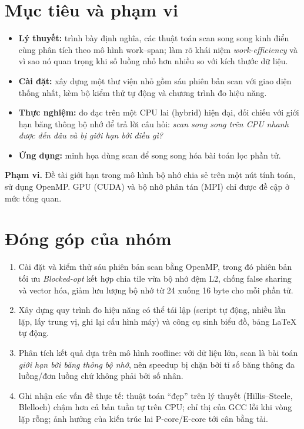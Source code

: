 \section{Mục tiêu và phạm vi}

\begin{itemize}
  \item \textbf{Lý thuyết:} trình bày định nghĩa, các thuật toán scan song song kinh điển cùng
        phân tích theo mô hình work--span; làm rõ khái niệm \emph{work-efficiency} và vì sao nó
        quan trọng khi số luồng nhỏ hơn nhiều so với kích thước dữ liệu.
  \item \textbf{Cài đặt:} xây dựng một thư viện nhỏ gồm sáu phiên bản scan với giao diện thống
        nhất, kèm bộ kiểm thử tự động và chương trình đo hiệu năng.
  \item \textbf{Thực nghiệm:} đo đạc trên một CPU lai (hybrid) hiện đại, đối chiếu với giới hạn
        băng thông bộ nhớ để trả lời câu hỏi: \emph{scan song song trên CPU nhanh được đến đâu
        và bị giới hạn bởi điều gì?}
  \item \textbf{Ứng dụng:} minh họa dùng scan để song song hóa bài toán lọc phần tử.
\end{itemize}

\noindent\textbf{Phạm vi.} Đề tài giới hạn trong mô hình bộ nhớ chia sẻ trên một nút tính toán,
sử dụng OpenMP. GPU (CUDA) và bộ nhớ phân tán (MPI) chỉ được đề cập ở mức tổng quan.

\section{Đóng góp của nhóm}

\begin{enumerate}
  \item Cài đặt và kiểm thử sáu phiên bản scan bằng OpenMP, trong đó phiên bản tối ưu
        \emph{Blocked-opt} kết hợp chia tile vừa bộ nhớ đệm L2, chống false sharing và vector
        hóa, giảm lưu lượng bộ nhớ từ 24 xuống 16 byte cho mỗi phần tử.
  \item Xây dựng quy trình đo hiệu năng có thể tái lập (script tự động, nhiều lần lặp, lấy
        trung vị, ghi lại cấu hình máy) và công cụ sinh biểu đồ, bảng LaTeX tự động.
  \item Phân tích kết quả dựa trên mô hình roofline: với dữ liệu lớn, scan là bài toán
        \emph{giới hạn bởi băng thông bộ nhớ}, nên speedup bị chặn bởi tỉ số băng thông đa
        luồng/đơn luồng chứ không phải bởi số nhân.
  \item Ghi nhận các vấn đề thực tế: thuật toán ``đẹp'' trên lý thuyết (Hillis--Steele,
        Blelloch) chậm hơn cả bản tuần tự trên CPU; chỉ thị  của GCC lỗi khi
        vòng lặp rỗng; ảnh hưởng của kiến trúc lai P-core/E-core tới cân bằng tải.
\end{enumerate}

